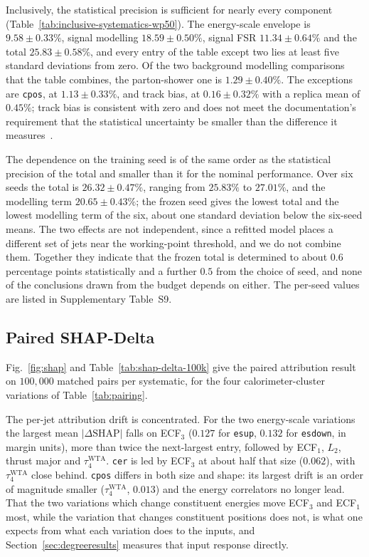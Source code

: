 \documentclass[pdflatex,sn-mathphys,Numbered,iicol]{sn-jnl}
\begin{document}
Inclusively, the statistical precision is sufficient for nearly every component
(Table~\ref{tab:inclusive-systematics-wp50}). The energy-scale envelope is
$9.58 \pm 0.33\%$, signal modelling $18.59 \pm 0.50\%$, signal FSR
$11.34 \pm 0.64\%$ and the total $25.83 \pm 0.58\%$, and every entry of the table except
two lies at least five standard deviations from zero. Of the two background
modelling comparisons that the table combines, the parton-shower one is
$1.29 \pm 0.40\%$. The exceptions are \texttt{cpos}, at
$1.13 \pm 0.33\%$, and track bias, at $0.16 \pm 0.32\%$ with a replica mean of
$0.45\%$; track bias is consistent with zero and does not meet the documentation's
requirement that the statistical uncertainty be smaller than the difference it
measures~\cite{ATLASGitLab}.

The dependence on the training seed is of the same order as the statistical precision
of the total and smaller than it for the nominal performance. Over six seeds the total
is $26.32 \pm 0.47\%$, ranging from $25.83\%$ to $27.01\%$, and the modelling term
$20.65 \pm 0.43\%$; the frozen seed gives the lowest total and the lowest modelling term of the six,
about one standard deviation below the six-seed means. The two effects
are not independent, since a refitted model places a different set of jets near the
working-point threshold, and we do not combine them. Together they indicate that the
frozen total is determined to about $0.6$ percentage points statistically and a further
$0.5$ from the choice of seed, and none of the conclusions drawn from the budget depends
on either. The per-seed values are listed in Supplementary Table~S9.



\subsection{Paired SHAP-Delta}
\label{sec:shapresults}

Fig.~\ref{fig:shap} and Table~\ref{tab:shap-delta-100k} give the paired attribution
result on $100{,}000$ matched pairs per systematic, for the four calorimeter-cluster
variations of Table~\ref{tab:pairing}.

The per-jet attribution drift is concentrated. For the two energy-scale variations the
largest mean $|\Delta\mathrm{SHAP}|$ falls on ECF$_3$ ($0.127$ for \texttt{esup},
$0.132$ for \texttt{esdown}, in margin units), more than twice the next-largest entry,
followed by ECF$_1$, $L_2$, thrust major and $\tau_4^{\mathrm{WTA}}$. \texttt{cer} is
led by ECF$_3$ at about half that size ($0.062$), with $\tau_4^{\mathrm{WTA}}$ close
behind. \texttt{cpos} differs in both size and shape: its largest drift is an order of
magnitude smaller ($\tau_4^{\mathrm{WTA}}$, $0.013$) and the energy correlators no
longer lead. That the two variations which change constituent energies move ECF$_3$ and ECF$_1$
most, while the variation that changes constituent positions does not, is
what one expects from what each variation does to the inputs, and
Section~\ref{sec:degreeresults} measures that input response directly.
\end{document}
